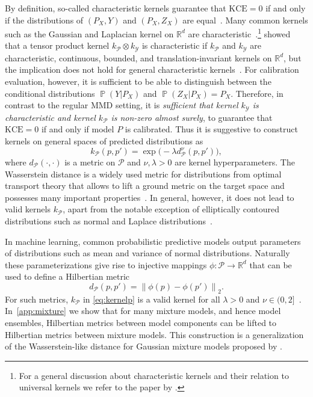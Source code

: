 \documentclass{article}
\DeclareMathOperator{\Prob}{\mathbb{P}}
\begin{document}
By definition, so-called characteristic kernels guarantee that
$\mathrm{KCE} = 0$ if and only if the distributions of $(P_X,Y)$
and $(P_X,Z_X)$ are equal~\citep{Fukumizu2004,Fukumizu2008}. Many common kernels
such as the Gaussian and Laplacian kernel on $\mathbb{R}^d$ are
characteristic~\citep{Fukumizu2008}.\footnote{For a general discussion about
characteristic kernels and their relation to universal kernels we refer to the 
paper by \citet{Sriperumbudur2011}.}  showed that a
tensor product kernel $k_{\mathcal{P}} \otimes k_{\mathcal{Y}}$ is characteristic if $k_{\mathcal{P}}$ and
$k_{\mathcal{Y}}$ are characteristic, continuous, bounded, and translation-invariant kernels
on $\mathbb{R}^d$, but the implication does not hold for general characteristic
kernels~\citep[Example~1]{Szabo2018}. For calibration evaluation, however,
it is sufficient to be able to distinguish between the conditional distributions
$\Prob(Y|P_X)$ and $\Prob(Z_X|P_X) = P_X$.
Therefore, in contrast to the regular MMD setting, it
is \emph{sufficient that kernel $k_{\mathcal{Y}}$ is characteristic and kernel $k_{\mathcal{P}}$ is
non-zero almost surely}, to guarantee that $\mathrm{KCE} = 0$ if and only if model $P$ is calibrated.
Thus it is suggestive to construct kernels on general spaces of predicted distributions 
as
\begin{equation}\label{eq:kernelp}
k_{\mathcal{P}}(p, p') = \exp{\big(- \lambda d^\nu_{\mathcal{P}}(p, p') \big)},
\end{equation}
where $d_{\mathcal{P}}(\cdot, \cdot)$ is a metric on $\mathcal{P}$ and $\nu, \lambda > 0$ 
are kernel hyperparameters. The Wasserstein distance is a widely used metric for
distributions from optimal transport theory that allows to lift a ground
metric on the target space and possesses many important
properties~\citep[see, e.g.,][Chapter~2.4]{Peyre2018}. In general, however,
it does not lead to valid kernels $k_{\mathcal{P}}$, apart from the notable exception
of elliptically contoured distributions such as normal and Laplace
distributions~\citep[Chapter~8.3]{Peyre2018}.

In machine learning, common
probabilistic predictive models output parameters of distributions such as
mean and variance of normal distributions. Naturally these
parameterizations give rise to injective mappings
$\phi \colon \mathcal{P} \to \mathbb{R}^d$ that can be used to define a
Hilbertian metric
\begin{equation*}\label{eq:hilbertian}
    d_{\mathcal{P}}(p, p') = {\|\phi(p) - \phi(p')\|}_2.
\end{equation*}
For such metrics, $k_{\mathcal{P}}$ in \cref{eq:kernelp}
is a valid kernel for all $\lambda > 0$ and
$\nu \in (0, 2]$~\citep[Corollary~3.3.3, Proposition~3.2.7]{Berg1984}.
In~\cref{app:mixture} we show that for many mixture models, and hence model ensembles,
Hilbertian metrics between model components
can be lifted to Hilbertian metrics between mixture models. This construction
is a generalization of the Wasserstein-like distance for Gaussian mixture models proposed
by \citet{Delon2019,Chen2019}.
\end{document}
